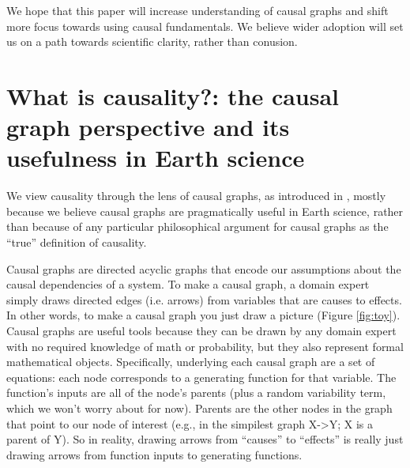 \documentclass[12pt]{article}
\begin{document}
We hope that this paper will increase understanding of causal graphs
and shift more focus towards using causal fundamentals. We believe
wider adoption will set us on a path towards scientific clarity,
rather than conusion.

\section{What is causality?: the causal graph perspective and its
  usefulness in Earth science}

We view causality through the lens of causal graphs, as introduced in
\citet{pearl1995causal}, mostly because we believe causal graphs are
pragmatically useful in Earth science, rather than because of any
particular philosophical argument for causal graphs as the ``true''
definition of causality.

Causal graphs are directed acyclic graphs that encode our assumptions
about the causal dependencies of a system.  To make a causal graph, a
domain expert simply draws directed edges (i.e. arrows) from variables
that are causes to effects. In other words, to make a causal graph you
just draw a picture (Figure \ref{fig:toy}). Causal graphs are useful
tools because they can be drawn by any domain expert with no required
knowledge of math or probability, but they also represent formal
mathematical objects. Specifically, underlying each causal graph are a
set of equations: each node corresponds to a generating function for
that variable. The function's inputs are all of the node's parents
(plus a random variability term, which we won't worry about for
now). Parents are the other nodes in the graph that point to our node
of interest (e.g., in the simpilest graph X->Y; X is a parent of
Y). So in reality, drawing arrows from ``causes'' to ``effects'' is
really just drawing arrows from function inputs to generating
functions.
\end{document}
